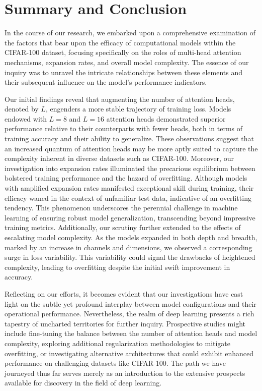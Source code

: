 \documentclass[10pt,twocolumn,letterpaper]{article}
\begin{document}
\section{Summary and Conclusion} \label{sec:summary}

In the course of our research, we embarked upon a comprehensive examination of the factors that bear upon the efficacy of computational models within the CIFAR-100 dataset, focusing specifically on the roles of multi-head attention mechanisms, expansion rates, and overall model complexity. The essence of our inquiry was to unravel the intricate relationships between these elements and their subsequent influence on the model's performance indicators.

Our initial findings reveal that augmenting the number of attention heads, denoted by \( L \), engenders a more stable trajectory of training loss. Models endowed with \( L=8 \) and \( L=16 \) attention heads demonstrated superior performance relative to their counterparts with fewer heads, both in terms of training accuracy and their ability to generalize. These observations suggest that an increased quantum of attention heads may be more aptly suited to capture the complexity inherent in diverse datasets such as CIFAR-100. Moreover, our investigation into expansion rates illuminated the precarious equilibrium between bolstered training performance and the hazard of overfitting. Although models with amplified expansion rates manifested exceptional skill during training, their efficacy waned in the context of unfamiliar test data, indicative of an overfitting tendency. This phenomenon underscores the perennial challenge in machine learning of ensuring robust model generalization, transcending beyond impressive training metrics. Additionally, our scrutiny further extended to the effects of escalating model complexity. As the models expanded in both depth and breadth, marked by an increase in channels and dimensions, we observed a corresponding surge in loss variability. This variability could signal the drawbacks of heightened complexity, leading to overfitting despite the initial swift improvement in accuracy.

Reflecting on our efforts, it becomes evident that our investigations have cast light on the subtle yet profound interplay between model configurations and their operational performance. Nevertheless, the realm of deep learning presents a rich tapestry of uncharted territories for further inquiry. Prospective studies might include fine-tuning the balance between the number of attention heads and model complexity, exploring additional regularization methodologies to mitigate overfitting, or investigating alternative architectures that could exhibit enhanced performance on challenging datasets like CIFAR-100. The path we have journeyed thus far serves merely as an introduction to the extensive prospects available for discovery in the field of deep learning.


   {
      \small
      
      
   }





% 
\end{document}

